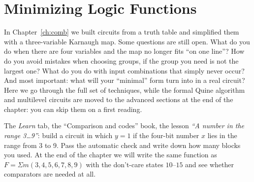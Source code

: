 \chapter{Minimizing Logic Functions}
\label{ch:minimize}

\providecommand{\kmapfour}[1]{%
  \foreach \kc/\klab in {0/00, 1/01, 2/11, 3/10} \node[font=\sffamily\small] at (\kc,0.85) {\klab};
  \foreach \kr/\klab in {0/00, 1/01, 2/11, 3/10} \node[font=\sffamily\small] at (-0.95,-\kr) {\klab};
  \node[font=\sffamily\small] at (-1.2,0.85) {$AB\backslash CD$};
  \foreach \kv [count=\ki from 0] in {#1} {%
    \pgfmathtruncatemacro{\kr}{int(\ki/4)}%
    \pgfmathtruncatemacro{\kc}{mod(\ki,4)}%
    \def\kfill{white}%
    \if 1\kv \def\kfill{FpgaLight}\fi
    \if x\kv \def\kfill{gray!25}\fi
    \node[draw, minimum size=10mm, font=\sffamily\large, fill=\kfill] at (\kc,-\kr) {\if x\kv$\times$\else\kv\fi};
    \node[font=\sffamily\footnotesize, text=gray, anchor=south east, inner sep=1pt] at (\kc+0.48,-\kr-0.48) {\ifcase\ki\relax 0\or 1\or 3\or 2\or 4\or 5\or 7\or 6\or 12\or 13\or 15\or 14\or 8\or 9\or 11\else 10\fi};
  }}
\providecommand{\kgrp}[6]{\draw[very thick, #1, rounded corners=4pt]
  (#2-#6,-#3+#6) rectangle (#4+#6,-#5-#6);}

In Chapter~\ref{ch:comb} we built circuits from a truth table and simplified
them with a three-variable Karnaugh map. Some questions are still open. What
do you do when there are four variables and the map no longer fits ``on one
line''? How do you avoid mistakes when choosing groups, if the group you need
is not the largest one? What do you do with input combinations that simply
never occur? And most important: what will your ``minimal'' form turn into in
a real circuit? Here we go through the full set of techniques, while the formal
Quine algorithm and multilevel circuits are moved to the advanced sections at
the end of the chapter: you can skip them on a first reading.

\begin{buildbox}
The \emph{Learn} tab, the ``Comparison and codes'' book, the lesson
\emph{``A number in the range 3\ldots 9''}: build a circuit in which $y=1$ if
the four-bit number $x$ lies in the range from 3 to 9. Pass the automatic
check and write down how many blocks you used. At the end of the chapter we
will write the same function as $F=\Sigma m(3,4,5,6,7,8,9)$ with the
don't-care states $10$--$15$ and see whether comparators are needed at all.
\end{buildbox}

